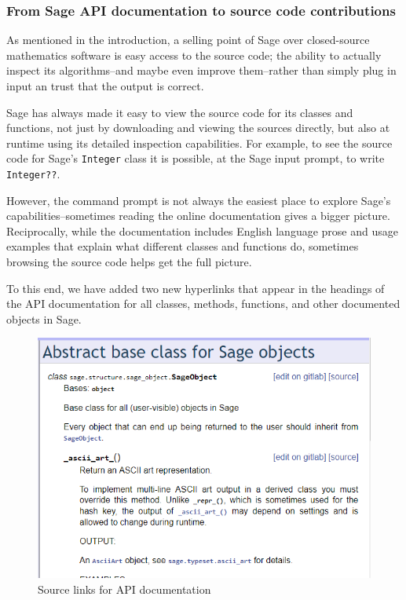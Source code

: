 {\hypertarget{source-in-documentation}{%
\subsubsection{From Sage API documentation to source code contributions}\label{source-in-documentation}}

As mentioned in the introduction, a selling point of Sage over closed-source
mathematics software is easy access to the source code; the ability to actually
inspect its algorithms--and maybe even improve them--rather than simply plug in
input an trust that the output is correct.

Sage has always made it easy to view the source code for its classes and
functions, not just by downloading and viewing the sources directly, but
also at runtime using its detailed inspection capabilities.  For example, to
see the source code for Sage's {\tt Integer} class it is possible, at the
Sage input prompt, to write {\tt Integer??}.


However, the command prompt is not always the easiest place to explore Sage's
capabilities--sometimes reading the online documentation gives a bigger
picture. Reciprocally, while the documentation includes English language prose
and usage examples that explain what different classes and functions do,
sometimes browsing the source code helps get the full picture.

To this end, we have added two new hyperlinks that appear in the headings of
the API documentation for all classes, methods, functions, and other documented
objects in Sage.


\begin{figure}[!ht]
    \centering
    \includegraphics{screenshots/source-links}
    \caption{Source links for API documentation}
    \label{fig:source-links}
\end{figure}

}

